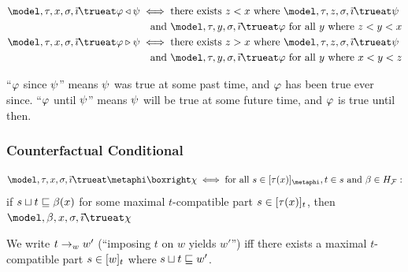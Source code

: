 \documentclass[../LogosReference.tex]{subfiles}
\begin{document}
\begin{definition}\label{def:since-until-truth}
	\begin{align}
		\model, \history, x, \assignment, \tempindex \trueat \metaA \since \metaB & \iff \text{there exists } z < x \text{ where } \model, \history, z, \assignment, \tempindex \trueat \metaB \notag         \\
		                                                                             & \quad \text{and } \model, \history, y, \assignment, \tempindex \trueat \metaA \text{ for all } y \text{ where } z < y < x \\
		\model, \history, x, \assignment, \tempindex \trueat \metaA \until \metaB & \iff \text{there exists } z > x \text{ where } \model, \history, z, \assignment, \tempindex \trueat \metaB \notag         \\
		                                                                             & \quad \text{and } \model, \history, y, \assignment, \tempindex \trueat \metaA \text{ for all } y \text{ where } x < y < z
	\end{align}
\end{definition}

\begin{remark}
	``$\varphi$ since $\psi$'' means $\psi$ was true at some past time, and $\varphi$ has been true ever since.
	``$\varphi$ until $\psi$'' means $\psi$ will be true at some future time, and $\varphi$ is true until then.
\end{remark}

\subsubsection{Counterfactual Conditional}

\begin{definition}\label{def:counterfactual-truth}
	\[
		\model, \history, x, \assignment, \tempindex \trueat \metaphi \boxright \metaC \iff \text{for all } s \in \maxcompat{\history(x)}{\metaphi}, t \in s \text{ and } \beta \in \historyspace:
	\]
	if $s\sqcup t \sqsubseteq \beta(x)$ for some maximal $t$-compatible part $s \in [\tau(x)]_{t}$, then $\model, \beta, x, \assignment, \tempindex \trueat \metaC$
\end{definition}

\begin{definition}[Imposition]\label{def:imposition}
	We write $t \to_{w}{w'}$ (``imposing $t$ on $w$ yields $w'$'') iff there exists a maximal $t$-compatible part $s \in [w]_{t}$ where $s\sqcup t \sqsubseteq w'$.
\end{definition}
\end{document}
